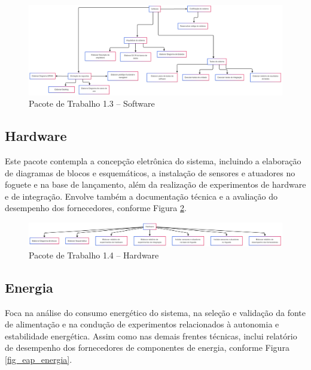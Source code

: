 
\begin{figure}[H]
	\centering
\includegraphics[width=15cm]{figuras/eap_software.png}
	\caption{Pacote de Trabalho 1.3 – Software}
	\label{fig_eap_software} 
\end{figure}

\subsection{Hardware}

Este pacote contempla a concepção eletrônica do sistema, incluindo a elaboração de diagramas de blocos e esquemáticos, a instalação de sensores e atuadores no foguete e na base de lançamento, além da realização de experimentos de hardware e de integração. Envolve também a documentação técnica e a avaliação do desempenho dos fornecedores, conforme Figura \ref{fig_eap_hardware}.

\begin{figure}[H]
	\centering
\includegraphics[width=15cm]{figuras/eap_hardware.png}
	\caption{Pacote de Trabalho 1.4 – Hardware}
	\label{fig_eap_hardware} 
\end{figure}

\subsection{Energia}

Foca na análise do consumo energético do sistema, na seleção e validação da fonte de alimentação e na condução de experimentos relacionados à autonomia e estabilidade energética. Assim como nas demais frentes técnicas, inclui relatório de desempenho dos fornecedores de componentes de energia, conforme Figura \ref{fig_eap_energia}.

